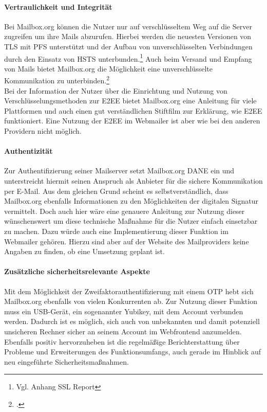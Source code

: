 \documentclass  [paper=a4,
				fontsize=12pt,
				listof=totoc,
				bibliography=totoc
				]{scrreprt}
\begin{document}
					\paragraph{Vertraulichkeit und Integrität}
						Bei Mailbox.org können die Nutzer nur auf verschlüsseltem Weg auf die Server zugreifen um ihre Mails abzurufen.
						Hierbei werden die neuesten Versionen von \ac{TLS} mit \ac{PFS} unterstützt und der Aufbau von unverschlüsselten Verbindungen durch den Einsatz von \ac{HSTS} unterbunden.\footnote{Vgl. Anhang SSL Report}
						Auch beim Versand und Empfang von Mails bietet Mailbox.org die Möglichkeit eine unverschlüsselte Kommunikation zu unterbinden.\footcite[Vgl.][]{Mailbox2014b}\medskip\\
						
						Bei der Information der Nutzer über die Einrichtung und Nutzung von Verschlüsselungsmethoden zur \ac{E2EE} bietet Mailbox.org eine Anleitung für viele Plattformen und auch einen gut verständlichen Stiftfilm zur Erklärung, wie \ac{E2EE} funktioniert.
						Eine Nutzung der \ac{E2EE} im Webmailer ist aber wie bei den anderen Providern nicht möglich.
						
					\paragraph{Authentizität}
						Zur Authentifizierung seiner Mailserver setzt Mailbox.org \ac{DANE} ein und unterstreicht hiermit seinen Anspruch als Anbieter für die sichere Kommunikation per E-Mail.
						Aus dem gleichen Grund scheint es selbstverständlich, dass Mailbox.org ebenfalls Informationen zu den Möglichkeiten der digitalen Signatur vermittelt.
						Doch auch hier wäre eine genauere Anleitung zur Nutzung dieser wünschenswert um diese technische Maßnahme für die Nutzer einfach einsetzbar zu machen.
						Dazu würde auch eine Implementierung dieser Funktion im Webmailer gehören.
						Hierzu sind aber auf der Website des Mailproviders keine Angaben zu finden, ob eine Umsetzung geplant ist.
						
					\paragraph{Zusätzliche sicherheitsrelevante Aspekte}
						Mit dem Möglichkeit der Zweifaktorauthentifizierung mit einem \ac{OTP} hebt sich Mailbox.org ebenfalls von vielen Konkurrenten ab.
						Zur Nutzung dieser Funktion muss ein USB-Gerät, ein sogenannter Yubikey, mit dem Account verbunden werden.
						Dadurch ist es möglich, sich auch von unbekannten und damit potenziell unsicheren Rechner sicher an seinem Account im Webfrontend anzumelden.
						Ebenfalls positiv hervorzuheben ist die regelmäßige Berichterstattung über Probleme und Erweiterungen des Funktionsumfangs, auch gerade im Hinblick auf neu eingeführte Sicherheitsmaßnahmen.
						
\end{document}
